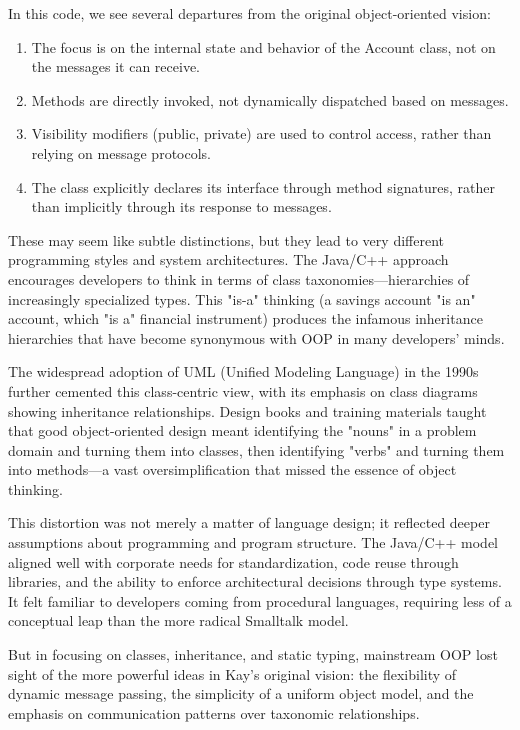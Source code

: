 \documentclass[11pt]{article}
\begin{document}
In this code, we see several departures from the original object-oriented vision:

\begin{enumerate}
\item The focus is on the internal state and behavior of the Account class, not on the messages it can receive.

\item Methods are directly invoked, not dynamically dispatched based on messages.

\item Visibility modifiers (public, private) are used to control access, rather than relying on message protocols.

\item The class explicitly declares its interface through method signatures, rather than implicitly through its response to messages.
\end{enumerate}

These may seem like subtle distinctions, but they lead to very different programming styles and system architectures. The Java/C++ approach encourages developers to think in terms of class taxonomies—hierarchies of increasingly specialized types. This "is-a" thinking (a savings account "is an" account, which "is a" financial instrument) produces the infamous inheritance hierarchies that have become synonymous with OOP in many developers' minds.

The widespread adoption of UML (Unified Modeling Language) in the 1990s further cemented this class-centric view, with its emphasis on class diagrams showing inheritance relationships. Design books and training materials taught that good object-oriented design meant identifying the "nouns" in a problem domain and turning them into classes, then identifying "verbs" and turning them into methods—a vast oversimplification that missed the essence of object thinking.

This distortion was not merely a matter of language design; it reflected deeper assumptions about programming and program structure. The Java/C++ model aligned well with corporate needs for standardization, code reuse through libraries, and the ability to enforce architectural decisions through type systems. It felt familiar to developers coming from procedural languages, requiring less of a conceptual leap than the more radical Smalltalk model.

But in focusing on classes, inheritance, and static typing, mainstream OOP lost sight of the more powerful ideas in Kay's original vision: the flexibility of dynamic message passing, the simplicity of a uniform object model, and the emphasis on communication patterns over taxonomic relationships.
\end{document}
